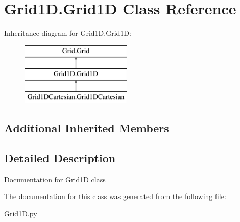 \hypertarget{classGrid1D_1_1Grid1D}{\section{Grid1\-D.\-Grid1\-D Class Reference}
\label{classGrid1D_1_1Grid1D}
}
Inheritance diagram for Grid1\-D.\-Grid1\-D\-:\begin{figure}[H]
\begin{center}
\leavevmode
\includegraphics[height=3.000000cm]{classGrid1D_1_1Grid1D}
\end{center}
\end{figure}
\subsection*{Additional Inherited Members}


\subsection{Detailed Description}
\begin{DoxyVerb}Documentation for Grid1D class
\end{DoxyVerb}
 

The documentation for this class was generated from the following file\-:\begin{DoxyCompactItemize}
\item 
Grid1\-D.\-py\end{DoxyCompactItemize}
